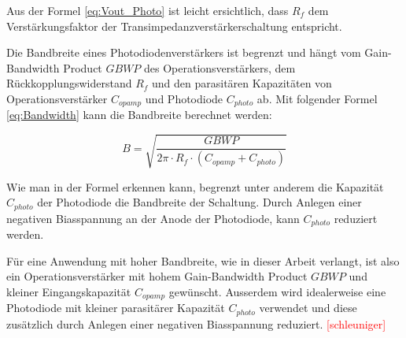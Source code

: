 Aus der Formel \ref{eq:Vout_Photo} ist leicht ersichtlich, dass $ R_{f} $ dem Verstärkungsfaktor der Transimpedanzverstärkerschaltung entspricht.

Die Bandbreite eines Photodiodenverstärkers ist begrenzt und hängt vom Gain-Bandwidth Product $GBWP$ des Operationsverstärkers, dem Rückkopplungswiderstand $ R_{f} $ und den parasitären Kapazitäten von Operationsverstärker $ C_{opamp} $ und Photodiode $ C_{photo} $ ab. Mit folgender Formel \ref{eq:Bandwidth} kann die Bandbreite berechnet werden:

\begin{equation}\label{eq:Bandwidth}
B=\sqrt{\frac{GBWP}{2\pi\cdot R_{f}\cdot (C_{opamp}+C_{photo})}}
\end{equation}

Wie man in der Formel erkennen kann, begrenzt unter anderem die Kapazität $ C_{photo} $ der Photodiode die Bandbreite der Schaltung. Durch Anlegen einer negativen Biasspannung an der Anode der Photodiode, kann $ C_{photo} $ reduziert werden.

Für eine Anwendung mit hoher Bandbreite, wie in dieser Arbeit verlangt, ist also ein Operationsverstärker mit hohem Gain-Bandwidth Product $GBWP$ und kleiner Eingangskapazität $ C_{opamp} $ gewünscht. Ausserdem wird idealerweise eine Photodiode mit kleiner parasitärer Kapazität $ C_{photo} $ verwendet und diese zusätzlich durch Anlegen einer negativen Biasspannung reduziert. \textcolor{red}{[schleuniger]}
